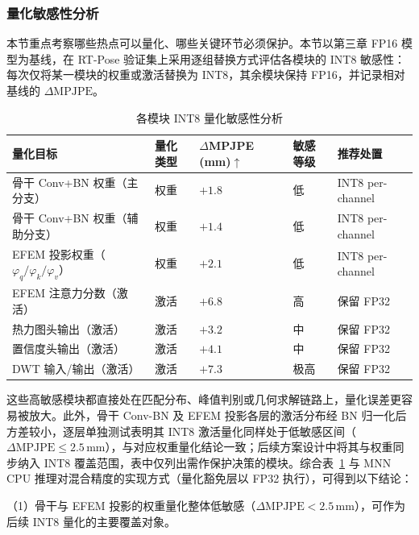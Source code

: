 \subsubsection{量化敏感性分析}

本节重点考察哪些热点可以量化、哪些关键环节必须保护。本节以第三章 FP16 模型为基线，在 RT-Pose 验证集上采用逐组替换方式评估各模块的 INT8 敏感性：每次仅将某一模块的权重或激活替换为 INT8，其余模块保持 FP16，并记录相对基线的 $\Delta\text{MPJPE}$。

\begin{table}[htbp]
  \centering
  \small
\caption{各模块 INT8 量化敏感性分析}
  \label{tab:quant_sensitivity}
  \begin{tabular}{@{}p{}p{}p{}p{}p{}@{}}
    \toprule
    量化目标 & 量化类型 & $\Delta$MPJPE (mm)$\uparrow$ & 敏感等级 & 推荐处置 \\
    \midrule
骨干 Conv+BN 权重（主分支）            & 权重 & $+1.8$ & 低   & INT8 per-channel \\
骨干 Conv+BN 权重（辅助分支）          & 权重 & $+1.4$ & 低   & INT8 per-channel \\
    EFEM 投影权重（$\varphi_q/\varphi_k/\varphi_v$）& 权重 & $+2.1$ & 低   & INT8 per-channel \\
    EFEM 注意力分数（激活）                & 激活 & $+6.8$ & 高   & 保留 FP32 \\
    热力图头输出（激活）                   & 激活 & $+3.2$ & 中   & 保留 FP32 \\
    置信度头输出（激活）                   & 激活 & $+4.1$ & 中   & 保留 FP32 \\
    DWT 输入/输出（激活）                  & 激活 & $+7.3$ & 极高 & 保留 FP32 \\
    \bottomrule
  \end{tabular}
\end{table}

这些高敏感模块都直接处在匹配分布、峰值判别或几何求解链路上，量化误差更容易被放大。此外，骨干 Conv-BN 及 EFEM 投影各层的激活分布经 BN 归一化后方差较小，逐层单独测试表明其 INT8 激活量化同样处于低敏感区间（$\Delta\text{MPJPE}\le2.5$\,mm），与对应权重量化结论一致；后续方案设计中将其与权重同步纳入 INT8 覆盖范围，表中仅列出需作保护决策的模块。综合表~\ref{tab:quant_sensitivity} 与 MNN CPU 推理对混合精度的实现方式（量化豁免层以 FP32 执行），可得到以下结论：

（1）骨干与 EFEM 投影的权重量化整体低敏感（$\Delta\text{MPJPE}<2.5$\,mm），可作为后续 INT8 量化的主要覆盖对象。

